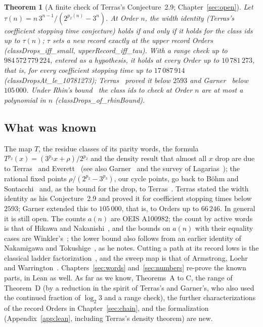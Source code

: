 \documentclass[10pt,a4paper,titlepage]{article}
\newcommand{\lean}[1]{\textsf{#1}}
\newtheorem{mainthm}{Theorem}
\begin{document}
\begin{mainthm}[A finite check of Terras's Conjecture~2.9; Chapter~\ref{sec:open}]
Let $\tau(n) = n\,3^{n-1}/(2^{p_2(n)} - 3^n)$. At Order $n$, the width identity
(Terras's coefficient stopping time conjecture) holds if and only if it holds for the class
ids up to $\tau(n)$; $\tau$ sets a new record exactly at the upper record Orders
(\lean{classDrops\_iff\_small}, \lean{upperRecord\_iff\_tau}). With a range check up to
$984\,572\,779\,224$, entered as a hypothesis, it holds at every Order up to
$10\,781\,273$, that is, for every coefficient stopping time up to $17\,087\,914$
(\lean{classDropsAt\_le\_10781273}); Terras~\cite{Terras1976} proved it below $2593$
and Garner~\cite{Garner1981} below $105\,000$. Under Rhin's bound~\cite{Rhin1987}
the class ids to check at Order $n$ are at most a polynomial in $n$
(\lean{classDrops\_of\_rhinBound}).
\end{mainthm}

\subsection*{What was known}

The map $T$, the residue classes of its parity words, the formula
$T^{p_2}(x) = (3^{p_3}x + \rho)/2^{p_2}$ and the density result that almost all $x$ drop
are due to Terras~\cite{Terras1976} and Everett~\cite{Everett1977} (see also
Garner~\cite{Garner1981} and the survey of Lagarias~\cite{Lagarias1985}); the rational
fixed points $\rho/(2^{p_2} - 3^{p_3})$, our cycle points, go back to B\"ohm and
Sontacchi~\cite{BohmSontacchi1978} and, as the bound for the drop, to Terras~\cite[Prop.~1.7]{Terras1976}. Terras stated the width identity as his
Conjecture~2.9 and proved it for coefficient stopping times below $2593$; Garner extended
this to $105\,000$, that is, to Orders up to $66\,246$. In general it is still open. The counts $a(n)$ are OEIS A100982; the count by
active words is that of Hikawa and Nakanishi~\cite{HikawaNakanishi2026}, and the bounds
on $a(n)$ with their equality cases are Winkler's~\cite{Winkler2026b}; the lower bound also follows from an
earlier identity of Nakamigawa and Tokushige~\cite{NakamigawaTokushige2012}, as he notes. Cutting a path at its record lows is the
classical ladder factorization~\cite{Feller1971}, and the sweep map is that of
Armstrong, Loehr and Warrington~\cite{ALW2015}. Chapters~\ref{sec:words}
and~\ref{sec:numbers} re-prove the known parts, in Lean as well. As far as we know,
Theorems~A to C, the range of Theorem~D (by a reduction in the spirit of Terras's and
Garner's, who also used the continued fraction of $\log_2 3$ and a range check), the further characterizations of the record Orders in
Chapter~\ref{sec:chain}, and the formalization (Appendix~\ref{app:lean}, including
Terras's density theorem) are new.
\end{document}
